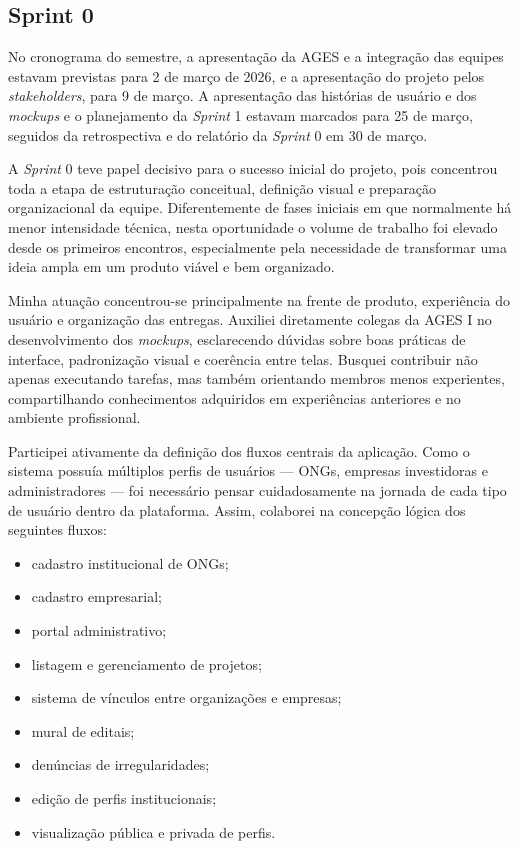 \subsection{Sprint 0}

No cronograma do semestre, a apresentação da \ac{AGES} e a integração das equipes estavam previstas para 2 de março de 2026, e a apresentação do projeto pelos \textit{stakeholders}, para 9 de março. A apresentação das histórias de usuário e dos \textit{mockups} e o planejamento da \textit{Sprint} 1 estavam marcados para 25 de março, seguidos da retrospectiva e do relatório da \textit{Sprint} 0 em 30 de março.

A \textit{Sprint} 0 teve papel decisivo para o sucesso inicial do projeto, pois concentrou toda a etapa de estruturação conceitual, definição visual e preparação organizacional da equipe. Diferentemente de fases iniciais em que normalmente há menor intensidade técnica, nesta oportunidade o volume de trabalho foi elevado desde os primeiros encontros, especialmente pela necessidade de transformar uma ideia ampla em um produto viável e bem organizado.

Minha atuação concentrou-se principalmente na frente de produto, experiência do usuário e organização das entregas. Auxiliei diretamente colegas da \ac{AGES} I no desenvolvimento dos \textit{mockups}, esclarecendo dúvidas sobre boas práticas de interface, padronização visual e coerência entre telas. Busquei contribuir não apenas executando tarefas, mas também orientando membros menos experientes, compartilhando conhecimentos adquiridos em experiências anteriores e no ambiente profissional.

Participei ativamente da definição dos fluxos centrais da aplicação. Como o sistema possuía múltiplos perfis de usuários --- \ac{ONGs}, empresas investidoras e administradores --- foi necessário pensar cuidadosamente na jornada de cada tipo de usuário dentro da plataforma. Assim, colaborei na concepção lógica dos seguintes fluxos:

\begin{itemize}
\item cadastro institucional de \ac{ONGs};
\item cadastro empresarial;
\item portal administrativo;
\item listagem e gerenciamento de projetos;
\item sistema de vínculos entre organizações e empresas;
\item mural de editais;
\item denúncias de irregularidades;
\item edição de perfis institucionais;
\item visualização pública e privada de perfis.
\end{itemize}

